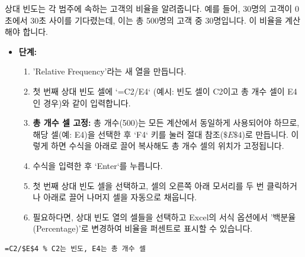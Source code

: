\documentclass[11pt,a4paper]{article}
\begin{document}
\begin{tcolorbox}[title={상대 빈도 계산 (Calculating Relative Frequency)}]
상대 빈도는 각 범주에 속하는 고객의 비율을 알려줍니다. 예를 들어, 30명의 고객이 0초에서 30초 사이를 기다렸는데, 이는 총 500명의 고객 중 30명입니다. 이 비율을 계산해야 합니다.

\begin{itemize}
    \item \textbf{단계:}
    \begin{enumerate}
        \item 'Relative Frequency'라는 새 열을 만듭니다.
        \item 첫 번째 상대 빈도 셀에 `=C2/E4` (예시: 빈도 셀이 C2이고 총 개수 셀이 E4인 경우)와 같이 입력합니다.
        \item \textbf{총 개수 셀 고정:} 총 개수(500)는 모든 계산에서 동일하게 사용되어야 하므로, 해당 셀(예: E4)을 선택한 후 `F4` 키를 눌러 절대 참조($\$E\$4$)로 만듭니다. 이렇게 하면 수식을 아래로 끌어 복사해도 총 개수 셀의 위치가 고정됩니다.
        \item 수식을 입력한 후 `Enter`를 누릅니다.
        \item 첫 번째 상대 빈도 셀을 선택하고, 셀의 오른쪽 아래 모서리를 두 번 클릭하거나 아래로 끌어 나머지 셀을 자동으로 채웁니다.
        \item 필요하다면, 상대 빈도 열의 셀들을 선택하고 Excel의 서식 옵션에서 '백분율 (Percentage)'로 변경하여 비율을 퍼센트로 표시할 수 있습니다.
    \end{enumerate}
\end{itemize}

\begin{lstlisting}[caption={Excel 상대 빈도 계산 예시}, label={lst:excel_relative_frequency}]
=C2/$E$4 % C2는 빈도, E4는 총 개수 셀
\end{lstlisting}


\end{tcolorbox}
\end{document}
